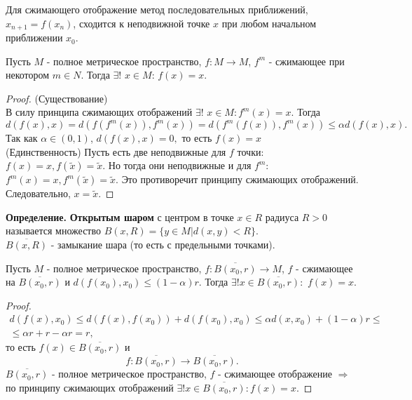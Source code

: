 Для сжимающего отображение метод последовательных приближений,
$x_{n+1} = f(x_n)$, сходится к неподвижной точке $x$ при любом начальном приближении $x_0$.
\begin{theorem}
    Пусть $M$ - полное метрическое пространство, $f : M \rightarrow M$, $f^m$ - сжимающее при некотором $m \in N$. Тогда $\exists!$ $x \in M$: $f(x) = x$.
\end{theorem}
\begin{proof}
    (Существование) \\
    В силу принципа сжимающих отображений $\exists!$ $x\in M:f^m(x)=x$. Тогда
    \begin{equation*}
        d(f(x),x)=d(f(f^m(x)), f^m(x))=d(f^m(f(x)), f^m(x)) \leq \alpha d(f(x), x).
    \end{equation*}
    Так как $\alpha \in (0,1)$, $d(f(x), x) = 0,$ то есть $f(x)=x$ \\
    (Единственность) Пусть есть две неподвижные для $f$ точки: $f(x) = x, f(\tilde{x}) = \tilde{x}$. Но тогда они неподвижные и для $f^m$: $f^m(x) = x, f^m(\tilde{x}) = \tilde{x}$. Это противоречит принципу
сжимающих отображений. Следовательно, $x = \tilde{x}$.
\end{proof}
\textbf{Определение.} \textbf{Открытым шаром} с центром в точке $x \in R $ радиуса $R > 0$ называется множество $B(x, R) = \{y \in M | d(x,y) < R\}$. \\
$\overline{B(x, R)}$ - замыкание шара (то есть с предельными точками).

\begin{theorem}
    Пусть $M$ - полное метрическое пространство, $f:\overline{B(x_0, r)} \rightarrow M$, $f$ - сжимающее на $\overline{B(x_0, r)}$ и $d(f(x_0), x_0) \leq (1-\alpha)r$. Тогда $\exists! x \in \overline{B(x_0, r)}: $ $f(x)=x$.
\end{theorem}
\begin{proof}
    \begin{gather*}
        d(f(x), x_0) \leq d(f(x), f(x_0)) + d(f(x_0), x_0) \leq \alpha d(x, x_0) +(1-\alpha)r \leq \\
        \leq \alpha r +r - \alpha r = r,
    \end{gather*}
    то есть $f(x) \in \overline{B(x_0, r)}$ и
    \begin{equation*}
        f:\overline{B(x_0, r)} \rightarrow \overline{B(x_0, r)}.
    \end{equation*}
    $\overline{B(x_0, r)}$ -  полное метрическое пространство, $f$ - сжимающее отображение $\Rightarrow$ по принципу сжимающих отображений $\exists! x \in \overline{B(x_0, r)}: f(x) = x.$
\end{proof}

